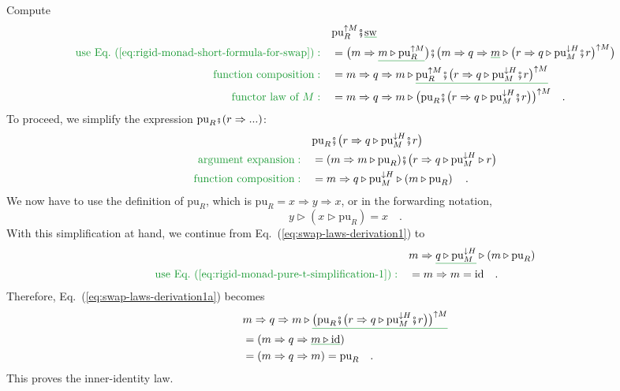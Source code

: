 Compute
\begin{align}
 & \text{pu}_{R}^{\uparrow M}\bef\gunderline{\text{sw}}\nonumber \\
{\color{greenunder}\text{use Eq.~(\ref{eq:rigid-monad-short-formula-for-swap})}:}\quad & =\big(m\Rightarrow\gunderline{m\triangleright\text{pu}_{R}^{\uparrow M}}\big)\bef\big(m\Rightarrow q\Rightarrow\gunderline m\triangleright\big(r\Rightarrow q\triangleright\text{pu}_{M}^{\downarrow H}\bef r\big)^{\uparrow M}\big)\nonumber \\
{\color{greenunder}\text{function composition}:}\quad & =m\Rightarrow q\Rightarrow m\triangleright\gunderline{\text{pu}_{R}^{\uparrow M}\bef\big(r\Rightarrow q\triangleright\text{pu}_{M}^{\downarrow H}\bef r\big)^{\uparrow M}}\nonumber \\
{\color{greenunder}\text{functor law of }M:}\quad & =m\Rightarrow q\Rightarrow m\triangleright\big(\text{pu}_{R}\bef\big(r\Rightarrow q\triangleright\text{pu}_{M}^{\downarrow H}\bef r\big)\big)^{\uparrow M}\quad.\label{eq:swap-laws-derivation1a}
\end{align}
To proceed, we simplify the expression $\text{pu}_{R}\bef(r\Rightarrow...)$:
\begin{align}
 & \text{pu}_{R}\bef\big(r\Rightarrow q\triangleright\text{pu}_{M}^{\downarrow H}\bef r\big)\nonumber \\
{\color{greenunder}\text{argument expansion}:}\quad & =(m\Rightarrow m\triangleright\text{pu}_{R})\bef\big(r\Rightarrow q\triangleright\text{pu}_{M}^{\downarrow H}\triangleright r\big)\nonumber \\
{\color{greenunder}\text{function composition}:}\quad & =m\Rightarrow q\triangleright\text{pu}_{M}^{\downarrow H}\triangleright\left(m\triangleright\text{pu}_{R}\right)\quad.\label{eq:swap-laws-derivation1}
\end{align}
We now have to use the definition of $\text{pu}_{R}$, which is $\text{pu}_{R}=x\Rightarrow y\Rightarrow x$,
or in the forwarding notation, 
\begin{equation}
y\triangleright\left(x\triangleright\text{pu}_{R}\right)=x\quad.\label{eq:rigid-monad-pure-t-simplification-1}
\end{equation}
With this simplification at hand, we continue from Eq.~(\ref{eq:swap-laws-derivation1})
to
\begin{align*}
 & m\Rightarrow\gunderline{q\triangleright\text{pu}_{M}^{\downarrow H}}\triangleright\left(m\triangleright\text{pu}_{R}\right)\\
{\color{greenunder}\text{use Eq.~(\ref{eq:rigid-monad-pure-t-simplification-1})}:}\quad & =m\Rightarrow m=\text{id}\quad.
\end{align*}
Therefore, Eq.~(\ref{eq:swap-laws-derivation1a}) becomes
\begin{align*}
 & m\Rightarrow q\Rightarrow m\triangleright\gunderline{\big(\text{pu}_{R}\bef\big(r\Rightarrow q\triangleright\text{pu}_{M}^{\downarrow H}\bef r\big)\big)^{\uparrow M}}\\
 & =(m\Rightarrow q\Rightarrow\gunderline{m\triangleright\text{id}})\\
 & =(m\Rightarrow q\Rightarrow m)=\text{pu}_{R}\quad.
\end{align*}
This proves the inner-identity law.

